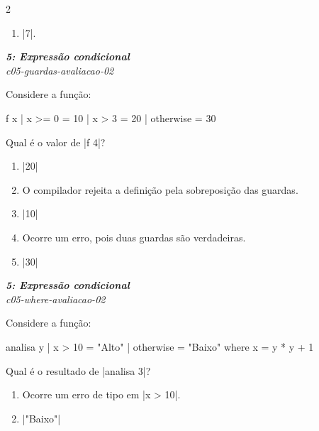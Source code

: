 \documentclass[a4paper,10pt,brazil]{article}
\begin{document}
\begin{multicols}{2}
\begin{enumerate}
  \item \haskellinline|7|.


\end{enumerate}

\begin{flushright}
  \footnotesize
  \textit{\textbf{5: Expressão condicional}}\\
  \textit{c05-guardas-avaliacao-02}\\

\end{flushright}
Considere a função:
\begin{haskellcode}
f x
  | x >= 0    = 10
  | x > 3     = 20
  | otherwise = 30
\end{haskellcode}
Qual é o valor de \haskellinline|f 4|?

\begin{enumerate}
  \item \haskellinline|20|

  \item O compilador rejeita a definição pela sobreposição das guardas.

  \item \haskellinline|10|

  \item Ocorre um erro, pois duas guardas são verdadeiras.

  \item \haskellinline|30|


\end{enumerate}

\begin{flushright}
  \footnotesize
  \textit{\textbf{5: Expressão condicional}}\\
  \textit{c05-where-avaliacao-02}\\

\end{flushright}
Considere a função:
\begin{haskellcode}
analisa y
  | x > 10    = "Alto"
  | otherwise = "Baixo"
  where
    x = y * y + 1
\end{haskellcode}
Qual é o resultado de \haskellinline|analisa 3|?

\begin{enumerate}
  \item Ocorre um erro de tipo em \haskellinline|x > 10|.

  \item \haskellinline|"Baixo"|


\end{enumerate}
\end{multicols}
\end{document}
